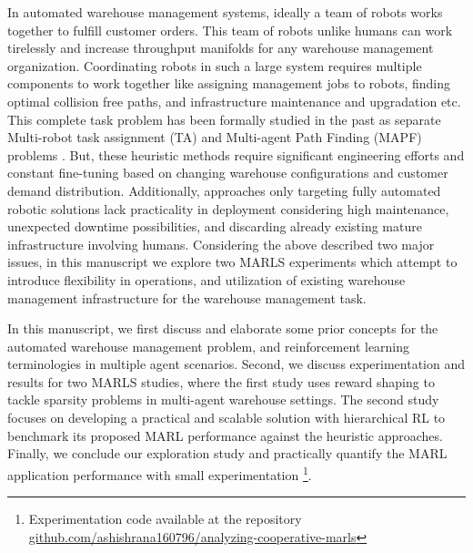 \documentclass{article}
\begin{document}
In automated warehouse management systems, ideally a team of robots works together to fulfill customer orders.
This team of robots unlike humans can work tirelessly and increase throughput manifolds for any warehouse management organization.
Coordinating robots in such a large system requires multiple components to work together like assigning management jobs to robots, finding optimal collision free paths, and infrastructure maintenance and upgradation etc.
This complete task problem has been formally studied in the past as separate Multi-robot task assignment (TA) and Multi-agent Path Finding (MAPF) problems \cite{korsah2013comprehensive, stern2019multi}.
But, these heuristic methods require significant engineering efforts and constant fine-tuning based on changing warehouse configurations and customer demand distribution.
Additionally, approaches only targeting fully automated robotic solutions lack practicality in deployment considering high maintenance, unexpected downtime possibilities, and discarding already existing mature infrastructure involving humans.
Considering the above described two major issues, in this manuscript we explore two MARLS experiments which attempt to introduce flexibility in operations, and utilization of existing warehouse management infrastructure for the warehouse management task.


In this manuscript, we first discuss and elaborate some prior concepts for the automated warehouse management problem, and reinforcement learning terminologies in multiple agent scenarios.
Second, we discuss experimentation and results for two MARLS studies, where the first study uses reward shaping to tackle sparsity problems in multi-agent warehouse settings.
The second study focuses on developing a practical and scalable solution with hierarchical RL to benchmark its proposed MARL performance against the heuristic approaches.
Finally, we conclude our exploration study and practically quantify the MARL application performance with small experimentation \footnote{Experimentation code available at the repository \href{https://github.com/ashishrana160796/analyzing-cooperative-marls}{github.com/ashishrana160796/analyzing-cooperative-marls}}.
\end{document}
